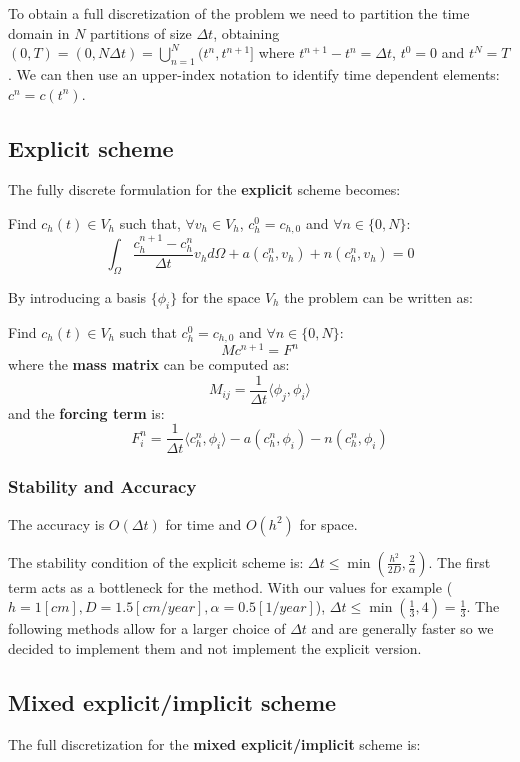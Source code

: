 \documentclass[12pt, letterpaper]{article}
\begin{document}
\noindent To obtain a full discretization of the problem we need to partition the time domain in $N$ partitions of size $\Delta t$, obtaining $(0, T)=(0,N\Delta t)=\bigcup_{n=1}^N(t^n, t^{n+1}]$ where $t^{n+1}-t^n=\Delta t$, $t^0=0$ and $t^N=T$. We can then use an upper-index notation to identify time dependent elements: $c^n = c(t^n)$.

\subsection{Explicit scheme}

The fully discrete formulation for the \textbf{explicit} scheme becomes:

\vspace{1em}
\noindent
Find $c_h(t)\in V_h$ such that, $\forall v_h\in V_h$, $c_h^0=c_{h,0}$ and $\forall n\in\{0, N\}$:
$$\int_\Omega\frac{c_h^{n+1}-c_h^n}{\Delta t}v_hd\Omega+a(c_h^n,v_h)+n(c_h^n,v_h)=0$$

\noindent By introducing a basis $\{\phi_i\}$ for the space $V_h$ the problem can be written as:

\vspace{1em}
\noindent
Find $c_h(t)\in V_h$ such that $c_h^0=c_{h,0}$ and $\forall n\in\{0, N\}$:
$$Mc^{n+1}=F^n$$
where the \textbf{mass matrix} can be computed as:
$$M_{ij}=\frac1{\Delta t}\langle\phi_j,\phi_i\rangle$$
and the \textbf{forcing term} is:
$$F_i^n=\frac1{\Delta t}\langle c_h^n,\phi_i\rangle-a(c_h^n,\phi_i)-n(c_h^n,\phi_i)$$

\subsubsection{Stability and Accuracy}
The accuracy is $O(\Delta t)$ for time and $O(h^2)$ for space.

\noindent The stability condition of the explicit scheme is: $\Delta t\leq\min(\frac{h^2}{2D}, \frac2\alpha)$. The first term acts as a bottleneck for the method. With our values for example ($h=1[cm], D=1.5[cm/year], \alpha=0.5[1/year]$), $\Delta t\leq\min(\frac13, 4)=\frac13$. The following methods allow for a larger choice of $\Delta t$ and are generally faster so we decided to implement them and not implement the explicit version.

\subsection{Mixed explicit/implicit scheme}
The full discretization for the \textbf{mixed explicit/implicit} scheme is:
\end{document}
